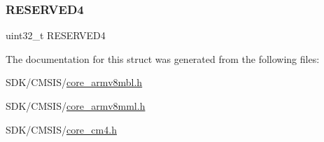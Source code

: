 \subsubsection{\texorpdfstring{R\+E\+S\+E\+R\+V\+E\+D4}{RESERVED4}}
{\footnotesize\ttfamily uint32\+\_\+t R\+E\+S\+E\+R\+V\+E\+D4}



The documentation for this struct was generated from the following files\+:\begin{DoxyCompactItemize}
\item 
S\+D\+K/\+C\+M\+S\+I\+S/\mbox{\hyperlink{core__armv8mbl_8h}{core\+\_\+armv8mbl.\+h}}\item 
S\+D\+K/\+C\+M\+S\+I\+S/\mbox{\hyperlink{core__armv8mml_8h}{core\+\_\+armv8mml.\+h}}\item 
S\+D\+K/\+C\+M\+S\+I\+S/\mbox{\hyperlink{core__cm4_8h}{core\+\_\+cm4.\+h}}\end{DoxyCompactItemize}
